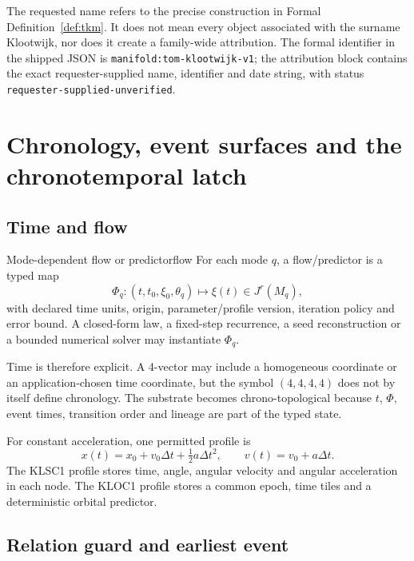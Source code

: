 \documentclass[10pt,a4paper]{article}
\newcommand{\code}[1]{\texttt{#1}}
\begin{document}
The requested name refers to the precise construction in Formal Definition~\ref{def:tkm}. It does not mean every object associated with the surname Klootwijk, nor does it create a family-wide attribution. The formal identifier in the shipped JSON is \code{manifold:tom-klootwijk-v1}; the attribution block contains the exact requester-supplied name, identifier and date string, with status \code{requester-supplied-unverified}.

\section{Chronology, event surfaces and the chronotemporal latch}
\label{sec:chrono}

\subsection{Time and flow}

\begin{formaldef}{Mode-dependent flow or predictor}{flow}
For each mode \(q\), a flow/predictor is a typed map
\[
\Phi_q:(t,t_0,\xi_0,\theta_q)\longmapsto \xi(t)\in J^r(M_q),
\]
with declared time units, origin, parameter/profile version, iteration policy and error bound. A closed-form law, a fixed-step recurrence, a seed reconstruction or a bounded numerical solver may instantiate \(\Phi_q\).
\end{formaldef}

Time is therefore explicit. A 4-vector may include a homogeneous coordinate or an application-chosen time coordinate, but the symbol \((4,4,4,4)\) does not by itself define chronology. The substrate becomes chrono-topological because \(t\), \(\Phi\), event times, transition order and lineage are part of the typed state.

For constant acceleration, one permitted profile is
\[
x(t)=x_0+v_0\Delta t+\tfrac12a\Delta t^2,
\qquad v(t)=v_0+a\Delta t.
\]
The KLSC1 profile stores time, angle, angular velocity and angular acceleration in each node. The KLOC1 profile stores a common epoch, time tiles and a deterministic orbital predictor.

\subsection{Relation guard and earliest event}
\end{document}
